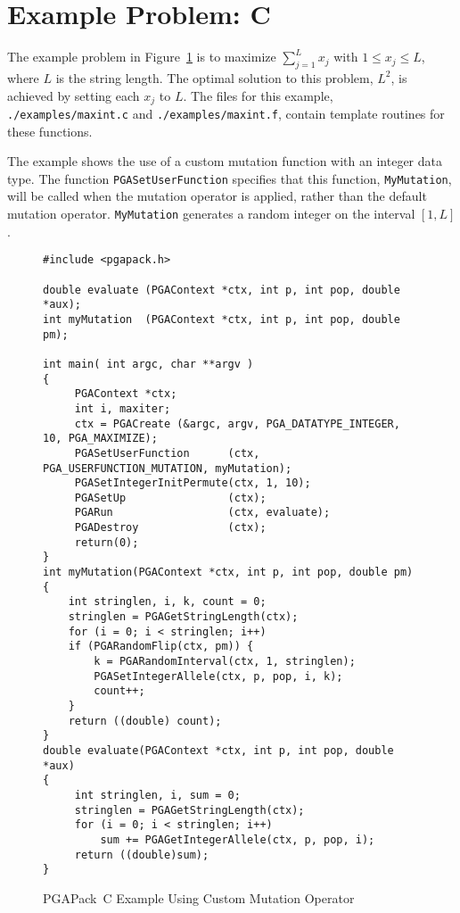 \documentclass{report}
\newcommand{\pga}{PGAPack}
\begin{document}
\section{Example Problem: C}

The example problem in Figure~\ref{example:maxbit-custom} is to maximize
$\sum_{j=1}^{L} x_{j}$ with $1 \leq x_j \leq L$, where $L$ is the string
length.  The optimal solution to this problem, $L^2$, is achieved by setting
each $x_j$ to $L$.  The files for this example, {\tt ./examples/maxint.c}
and {\tt ./examples/maxint.f}, contain template routines for these functions.

The example shows the use of a custom mutation function with an integer data
type.  The function {\tt PGASetUserFunction} specifies that this function,
{\tt MyMutation}, will be called when the mutation operator is applied, rather
than the default mutation operator.  {\tt MyMutation} generates a random
integer on the interval $[1,L]$.

\begin{figure}
\begin{verbatim}
#include <pgapack.h>

double evaluate (PGAContext *ctx, int p, int pop, double *aux);
int myMutation  (PGAContext *ctx, int p, int pop, double pm);

int main( int argc, char **argv )
{
     PGAContext *ctx; 
     int i, maxiter;
     ctx = PGACreate (&argc, argv, PGA_DATATYPE_INTEGER, 10, PGA_MAXIMIZE);
     PGASetUserFunction      (ctx, PGA_USERFUNCTION_MUTATION, myMutation);
     PGASetIntegerInitPermute(ctx, 1, 10);
     PGASetUp                (ctx);
     PGARun                  (ctx, evaluate);
     PGADestroy              (ctx);
     return(0);
}
int myMutation(PGAContext *ctx, int p, int pop, double pm)
{
    int stringlen, i, k, count = 0;
    stringlen = PGAGetStringLength(ctx);
    for (i = 0; i < stringlen; i++)
    if (PGARandomFlip(ctx, pm)) {
        k = PGARandomInterval(ctx, 1, stringlen);
        PGASetIntegerAllele(ctx, p, pop, i, k);
        count++;
    }
    return ((double) count);
}
double evaluate(PGAContext *ctx, int p, int pop, double *aux)
{
     int stringlen, i, sum = 0;
     stringlen = PGAGetStringLength(ctx);
     for (i = 0; i < stringlen; i++)
         sum += PGAGetIntegerAllele(ctx, p, pop, i);
     return ((double)sum);
}
\end{verbatim}
\caption{\pga\ C Example Using Custom Mutation Operator}
\label{example:maxbit-custom}
\end{figure}
\end{document}
